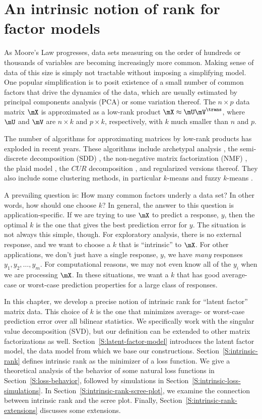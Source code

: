 
\chapter{An intrinsic notion of rank for factor models}

As Moore's Law progresses, data sets measuring on the order of hundreds or
thousands of variables are becoming increasingly more common. Making sense of
data of this size is simply not tractable without imposing a simplifying
model. One popular simplification is to posit existence of a small number of
common factors that drive the dynamics of the data, which are usually
estimated by principal components analysis (PCA) or some variation thereof.
The $n \times p$ data matrix $\mX$ is approximated as a low-rank product $\mX
\approx \mU \mV^\trans$, where $\mU$ and $\mV$ are $n \times k$ and $p \times
k$, respectively, with $k$ much smaller than $n$ and $p$.

The number of algorithms for approximating matrices by low-rank products has
exploded in recent years. These algorithms include archetypal analysis
\cite{cutler1994aa}, the semi-discrete decomposition (SDD)
\cite{kolda1998smd}, the non-negative matrix factorization (NMF)
\cite{lee1999lpo}, the plaid model \cite{lazzeroni2002pmg}, the $CUR$
decomposition \cite{drineas2007fmc}, and regularized versions thereof. They
also include some clustering methods, in particular $k$-means and fuzzy
$k$-means \cite{bezdek1980fmp}.

A prevailing question is: How many common factors underly a data set? In other
words, how should one choose $k$? In general, the answer to this question is
application-specific. If we are trying to use $\mX$ to predict a response,
$y$, then the optimal $k$ is the one that gives the best prediction error
for $y$. The situation is not always this simple, though. For exploratory
analysis, there is no external response, and we want to choose a $k$ that is
``intrinsic'' to $\mX$. For other applications, we don't just have a single
response, $y$, we have \emph{many} responses $y_1, y_2, \ldots, y_m$.
For computational reasons, we may not even know all of the $y_i$ when we are
processing $\mX$. In these situations, we want a $k$ that has good
average-case or worst-case prediction properties for a large class of 
responses.

In this chapter, we develop a precise notion of intrinsic rank for ``latent
factor'' matrix data. This choice of $k$ is the one that minimizes average- or
worst-case prediction error over all bilinear statistics. We specifically work
with the singular value decomposition (SVD), but our definition can be
extended to other matrix factorizations as well.
Section~\ref{S:latent-factor-model} introduces the latent factor model, the
data model from which we base our constructions.
Section~\ref{S:intrinsic-rank} defines intrinsic rank as the minimizer of a
loss function. We give a theoretical analysis of the behavior of some natural
loss functions in Section~\ref{S:loss-behavior}, followed by simulations in
Section~\ref{S:intrinsic-loss-simulations}. In
Section~\ref{S:intrinsic-rank-scree-plot}, we examine the connection between
intrinsic rank and the scree plot. Finally,
Section~\ref{S:intrinsic-rank-extensions} discusses some extensions.


